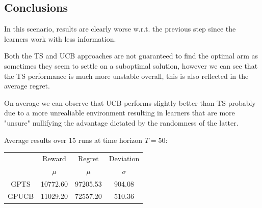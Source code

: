 \clearpage %

\subsection{Conclusions}

In this scenario, results are clearly worse w.r.t. the previous step since the learners work with less information.

Both the TS and UCB approaches are not guaranteed to find the optimal arm as sometimes they seem to settle on a suboptimal solution, however we can see that the TS performance is much more unstable overall, this is also reflected in the average regret.

On average we can observe that UCB performs slightly better than TS probably due to a more unrealiable environment resulting in learners that are more "unsure" nullifying the advantage dictated by the randomness of the latter.

Average results over 15 runs at time horizon $T = 50$:

\begin{table}[h]
	\center
	\begin{tabular}{|c|cc|c|}
	\hline \hline
		\cellcolor{blue!25} & Reward 	& Regret	& Deviation \\
	\cline{2-4}
		\cellcolor{blue!25} & $\mu$		& $\mu$		& $\sigma$	\\
	\hline \hline
		GPTS 				& 10772.60	& 97205.53	& 904.08	\\
	\hline
		GPUCB				& 11029.20	& 72557.20	& 510.36	\\
	\hline \hline
	\end{tabular}
\end{table}
